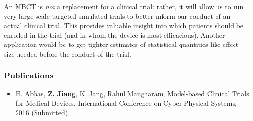 \documentclass[a4paper]{article}
\begin{document}
An MBCT is \emph{not} a replacement for a clinical trial: rather, it will allow us to run very large-scale targeted simulated trials to better inform our conduct of an actual clinical trial.
This provides valuable insight into which patients should be enrolled in the trial (and in whom the device is most efficacious).
Another application would be to get tighter estimates of statistical quantities like effect size needed before the conduct of the trial. 
%
%
%
\subsubsection{Publications}
\begin{itemize}
\item H. Abbas, \textbf{Z. Jiang}, K. Jang, Rahul Mangharam, Model-based Clinical Trials for Medical Devices. International Conference on Cyber-Physical Systems, 2016 (Submitted).
\end{itemize}
\end{document}
